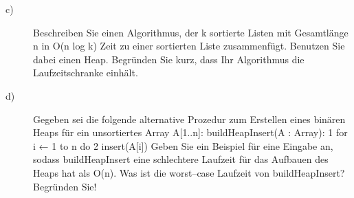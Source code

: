 \documentclass[12pt, a4paper, twoside]{article}
\begin{document}
\begin{description}
		\item[c)] Beschreiben Sie einen Algorithmus, der k sortierte Listen mit Gesamtlänge n in
		O(n log k) Zeit zu einer sortierten Liste zusammenfügt. Benutzen Sie dabei einen Heap.
		Begründen Sie kurz, dass Ihr Algorithmus die Laufzeitschranke einhält.
		
		\item[d)] Gegeben sei die folgende alternative Prozedur zum Erstellen eines binären Heaps für
		ein unsortiertes Array A[1..n]:
		buildHeapInsert(A : Array):
		1 for i ← 1 to n do
		2 insert(A[i])
		Geben Sie ein Beispiel für eine Eingabe an, sodass buildHeapInsert eine schlechtere
		Laufzeit für das Aufbauen des Heaps hat als O(n). Was ist die worst–case Laufzeit von
		buildHeapInsert? Begründen Sie!
		
	\end{description}
	
	
	
\end{document}
